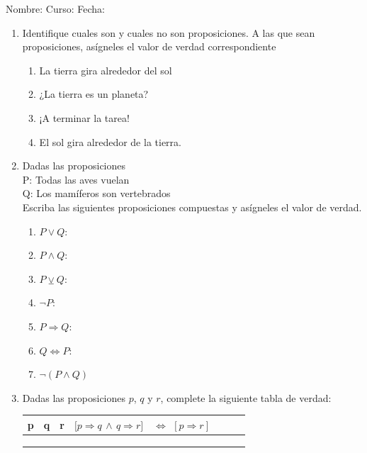\documentclass[letterpaper,fleqn]{article}
\newcommand{\LineaNombre}{%
\par
\vspace{\baselineskip}
Nombre:\hrulefill \; Curso: \underline{\hspace*{48pt}} \; Fecha: \underline{\hspace*{2.5cm}} \relax
\par}
\begin{document}
\LineaNombre
\begin{enumerate}
 \item Identifique cuales son y cuales no son proposiciones. A las que sean proposiciones, as\'{i}gneles el valor de verdad correspondiente
 \begin{enumerate}
 \item La tierra gira alrededor del sol
 \item ¿La tierra es un planeta?
 \item ¡A terminar la tarea!
 \item El sol gira alrededor de la tierra.
 \end{enumerate}
 \item Dadas las proposiciones\\
 P: Todas las aves vuelan\\
 Q: Los mamíferos son vertebrados\\
Escriba las siguientes proposiciones compuestas y asígneles el valor de verdad.
\begin{enumerate}
\item $P\vee Q$:
\item $P\wedge Q$:
\item $P \veebar Q$:
\item $\neg P$:
\item $P\Rightarrow Q$:
\item $Q\Leftrightarrow P$:
\item $\neg (P\wedge Q)$
\end{enumerate}
\item Dadas las proposiciones $p$, $q$ y $r$, complete la siguiente tabla de verdad:
\begin{center}
\begin{tabular}{|c|c|c|c|c|c|c|c|}
\hline 
p & q & r & $[p\Rightarrow q$ $\wedge$ $q\Rightarrow r]$ & $\Leftrightarrow$ $[p\Rightarrow r]$ \\ 
\hline 
 &  &  &   &  \\ 
\hline 
 & & & &  \\ \hline
  & & & &  \\ \hline
\end{tabular} 
\end{center}
 \end{enumerate}
\end{document}
